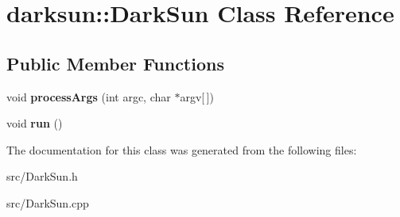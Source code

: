 \hypertarget{classdarksun_1_1_dark_sun}{}\section{darksun\+::Dark\+Sun Class Reference}
\label{classdarksun_1_1_dark_sun}
\subsection*{Public Member Functions}
\begin{DoxyCompactItemize}
\item 
\mbox{\label{classdarksun_1_1_dark_sun_a76cad14825cca52dac8d8f000ef7b616}} 
void {\bfseries process\+Args} (int argc, char $\ast$argv\mbox{[}$\,$\mbox{]})
\item 
\mbox{\label{classdarksun_1_1_dark_sun_a01fb4105a4efa2fe2172fe90e7934049}} 
void {\bfseries run} ()
\end{DoxyCompactItemize}


The documentation for this class was generated from the following files\+:\begin{DoxyCompactItemize}
\item 
src/Dark\+Sun.\+h\item 
src/Dark\+Sun.\+cpp\end{DoxyCompactItemize}
